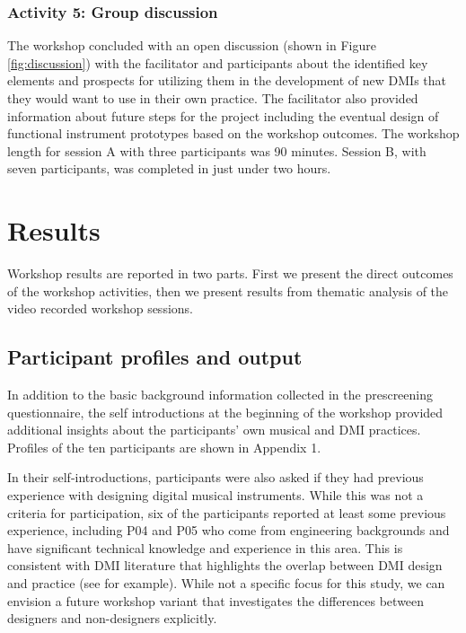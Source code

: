 \documentclass[letterpaper, 12pt]{article}
\begin{document}
\subsubsection{Activity 5: Group discussion}
\label{sec:activity-5-group-discussion}

The workshop concluded with an open discussion (shown in Figure \ref{fig:discussion}) with the facilitator and participants about the identified key elements and prospects for utilizing them in the development of new DMIs that they would want to use in their own practice. The facilitator also provided information about future steps for the project including the eventual design of functional instrument prototypes based on the workshop outcomes. The workshop length for session A with three participants was 90 minutes. Session B, with seven participants, was completed in just under two hours. 

\section{Results}
\label{sec:results}

Workshop results are reported in two parts. First we present the direct outcomes of the workshop activities, then we present results from thematic analysis of the video recorded workshop sessions. 

\subsection{Participant profiles and output}
\label{sec:participant-profiles-and-output}

In addition to the basic background information collected in the prescreening questionnaire, the self introductions at the beginning of the workshop provided additional insights about the participants' own musical and DMI practices. Profiles of the ten participants are shown in Appendix 1.

In their self-introductions, participants were also asked if they had previous experience with designing digital musical instruments. While this was not a criteria for participation, six of the participants reported at least some previous experience, including P04 and P05 who come from engineering backgrounds and have significant technical knowledge and experience in this area. This is consistent with DMI literature that highlights the overlap between DMI design and practice (see \citet{Magnusson2008, Morreale2017, Morreale2018} for example). While not a specific focus for this study, we can envision a future workshop variant that investigates the differences between designers and non-designers explicitly.
\end{document}
